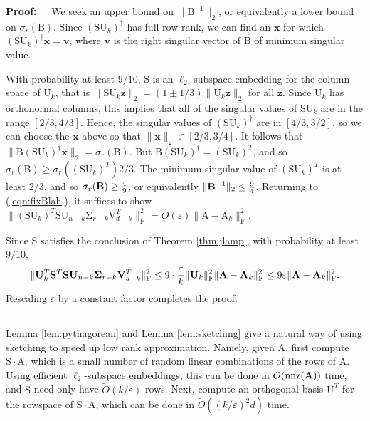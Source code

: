 \documentclass[11pt]{article}
\newcommand{\FNormS}[1]{\mbox{}\|#1\|_\mathrm{F}^2}
\newenvironment{proof}{\begin{trivlist} \item {\bf Proof:~~}}
  {\qed\end{trivlist}}
\newcommand{\mat}[1]{{\ensuremath{\bm{\mathrm{#1}}}}}
\def\ve{{\mathbf v}}
\def\matA{\mat{A}}
\def\matB{\mat{B}}
\def\matS{\mat{S}}
\def\matU{\mat{U}}
\def\matV{\mat{V}}
\def\nnz{{ \rm nnz }}
\def\frac#1#2{{#1\over #2}}
\def\qed{\hfill\rule{2mm}{2mm}}
\def\x{{\mathbf x}}
\def\z{{\mathbf z}}
\newcommand{\eps}{\varepsilon}
\begin{document}
\begin{proof}
We seek an upper bound on $\|\matB^{-1}\|_2$, or equivalently a lower bound on $\sigma_r(\matB)$. Since 
$(\matS \matU_k)^{\dagger}$ has full row rank, we can find an $\x$ for which $(\matS \matU_k)^{\dagger}\x = \ve$, where
$\ve$ is the right singular vector of $\matB$ of minimum singular value. 

With probability at least $9/10$, $\matS$ is an $\ell_2$-subspace embedding for the column space
of $\matU_k$, that is $\|\matS\matU_k\z\|_2 = (1\pm 1/3) \|\matU_k\z\|_2$ for all $\z$. 
Since $\matU_k$ has orthonormal columns,
this implies that all of the singular values of $\matS \matU_k$ are in the range $[2/3, 4/3]$.
Hence, the singular values of
$(\matS \matU_k)^{\dagger}$ are in $[4/3, 3/2]$, so we can choose the $\x$ above so that $\|\x\|_2 \in [2/3, 3/4]$. It follows that
$\|\matB (\matS \matU_k)^{\dagger}\x\|_2 = \sigma_r(\matB)$. But $\matB (\matS \matU_k)^{\dagger} = (\matS \matU_k)^T$,
and so $\sigma_r(\matB) \geq \sigma_r( (\matS \matU_k)^T) 2/3$. 
The minimum singular value of $(\matS \matU_k)^T$ is at least $2/3$, and so $\sigma_r(\matB) \geq \frac{4}{9}$, or
equivalently $\|\matB^{-1}\|_2 \leq \frac{9}{4}$. Returning to (\ref{eqn:fixBlah}), it suffices to show
$\FNormS{(\matS\matU_k)^T \matS\matU_{n-k}\mat\Sigma_{r-k}\matV_{d-k}^T} = O(\eps) \FNormS{\matA-\matA_k}$.

Since $\matS$ satisfies the conclusion of Theorem \ref{thm:jlamp}, with probability at least $9/10$,
$$\FNormS{\matU_k^T \matS^T \matS \matU_{n-k}\mat\Sigma_{r-k}\matV_{d-k}^T} \leq 9 \cdot \frac{\eps}{k} \FNormS{\matU_k} \FNormS{\matA-\matA_k} 
\leq 9\eps \FNormS{\matA-\matA_k}.$$
Rescaling $\eps$ by a constant factor completes
the proof. 
\end{proof}
Lemma \ref{lem:pythagorean} and Lemma \ref{lem:sketching} give a natural way of using sketching to 
speed up low rank approximation. 
Namely, given $\matA$, first compute $\matS \cdot \matA$, which is a small number of random linear combinations
of the rows of $\matA$. Using efficient $\ell_2$-subspace embeddings, this can be done in $O(\nnz(\matA))$ time,
and $\matS$ need only have $\tilde{O}(k/\eps)$ rows. 
Next, compute an orthogonal basis $\matU^T$ for the rowspace of $\matS \cdot \matA$, 
which can be done in $\tilde{O}((k/\eps)^2 d)$
time. 
\end{document}
